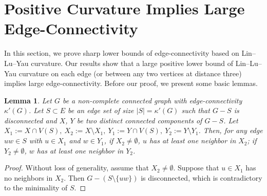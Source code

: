 \documentclass[11pt,bezier]{article}
\newtheorem{lemma}{Lemma}[section]
\theoremstyle{definition}
\theoremstyle{definition}
\theoremstyle{nonumber}
\newtheorem*{theorem*}{Theorem}
\begin{document}
\section{Positive Curvature Implies Large Edge-Connectivity}\label{section}



In this section, we prove sharp lower bounds of edge-connectivity based on Lin--Lu--Yau curvature. Our results show that a large positive lower bound of Lin--Lu--Yau curvature on each edge (or between any two vertices at distance three) implies large edge-connectivity. Before our proof, we present some basic lemmas.

\begin{lemma} \label{neighbor}
Let $G$ be a non-complete connected graph with edge-connectivity $\kappa'(G)$. Let $S \subset E$ be an edge set of size $|S| = \kappa'(G)$ such that $G - S$ is disconnected and $X$, $Y$ be two distinct connected components of $G - S$. Let $X_1:=X\cap V(S),\ X_2:=X \setminus X_1,\ Y_1:=Y\cap V(S),\ Y_2:=Y \setminus Y_1$. Then, for any edge $uw \in S$ with $u\in X_1$ and $w\in Y_1$, if $X_2\ne \emptyset$, $u$ has at least one neighbor in $X_2$; if $Y_2\ne \emptyset$, $w$ has at least one neighbor in $Y_2$.
\end{lemma}

\begin{proof}
Without loss of generality, assume that $X_2\ne\emptyset$. Suppose that $u\in X_1$ has no neighbors in $X_2$. Then $G - (S \setminus \{uw\})$ is disconnected, which is contradictory to the minimality of $S$.
\end{proof}
\end{document}
